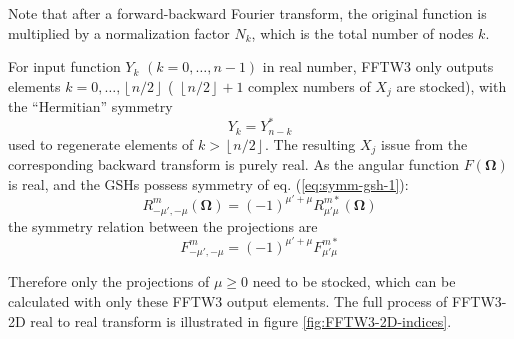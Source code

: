 Note that after a forward-backward Fourier transform, the original
function is multiplied by a normalization factor $N_{k}$, which is
the total number of nodes $k$.

For input function $Y_{k}$ $(k=0,\ldots,n-1)$ in real number, FFTW3
only outputs elements $k=0,\ldots,\left\lfloor n/2\right\rfloor $
( $\left\lfloor n/2\right\rfloor +1$ complex numbers of $X_{j}$
are stocked), with the “Hermitian” symmetry
\begin{equation}
Y_{k}=Y_{n-k}^{*}\label{eq:yk_conjg}
\end{equation}
used to regenerate elements of $k>\left\lfloor n/2\right\rfloor $.
The resulting $X_{j}$ issue from the corresponding backward transform
is purely real. As the angular function $F(\mathbf{\Omega})$ is real,
and the \acs{GSH}s possess symmetry of eq. (\ref{eq:symm-gsh-1}):
\begin{equation}
R_{-\mu',-\mu}^{m}(\mathbf{\Omega})=\left(-1\right)^{\mu'+\mu}R_{\mu'\mu}^{m*}(\mathbf{\Omega})
\end{equation}
the symmetry relation between the projections are
\begin{equation}
F_{-\mu',-\mu}^{m}=\left(-1\right)^{\mu'+\mu}F_{\mu'\mu}^{m*}\label{eq:symm_f_m_mup_mu}
\end{equation}

Therefore only the projections of $\mu\geq0$ need to be stocked,
which can be calculated with only these FFTW3 output elements. The
full process of FFTW3-2D real to real transform is illustrated in
figure \ref{fig:FFTW3-2D-indices}.


